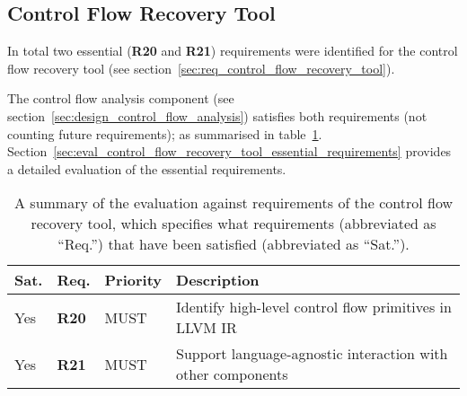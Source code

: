 
\subsection{Control Flow Recovery Tool}

In total two essential (\textbf{R20} and \textbf{R21}) requirements were identified for the control flow recovery tool (see section~\ref{sec:req_control_flow_recovery_tool}).

The control flow analysis component (see section~\ref{sec:design_control_flow_analysis}) satisfies both requirements (not counting future requirements); as summarised in table~\ref{tbl:eval_summary_of_control_flow_recovery_tool}. Section~\ref{sec:eval_control_flow_recovery_tool_essential_requirements} provides a detailed evaluation of the essential requirements.

\begin{table}[htbp]
	\begin{center}
		\begin{tabular}{|l|l|l|l|}
			\hline
			Sat. & Req. & Priority & Description \\
			\hline
			\rowcolor{light_green_3}
			Yes & \textbf{R20} & MUST & Identify high-level control flow primitives in LLVM IR \\
			\rowcolor{light_green_3}
			Yes & \textbf{R21} & MUST & Support language-agnostic interaction with other components \\
			\hline
		\end{tabular}
	\end{center}
	\caption{A summary of the evaluation against requirements of the control flow recovery tool, which specifies what requirements (abbreviated as ``Req.'') that have been satisfied (abbreviated as ``Sat.'').}
	\label{tbl:eval_summary_of_control_flow_recovery_tool}
\end{table}



